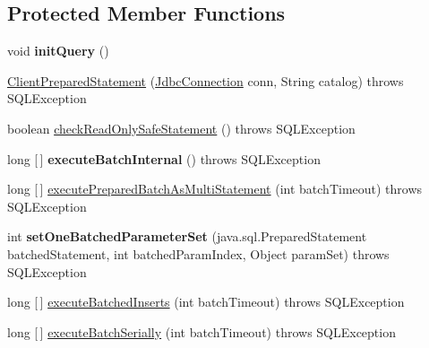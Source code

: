 \subsection*{Protected Member Functions}
\begin{DoxyCompactItemize}
\item 
\mbox{\label{classcom_1_1mysql_1_1cj_1_1jdbc_1_1_client_prepared_statement_a3baa03c73cc707a13dd2c2a82cf523c0}} 
void {\bfseries init\+Query} ()
\item 
\mbox{\hyperlink{classcom_1_1mysql_1_1cj_1_1jdbc_1_1_client_prepared_statement_a7a030c8a939d2cd9798b9b6b1ccc52a1}{Client\+Prepared\+Statement}} (\mbox{\hyperlink{interfacecom_1_1mysql_1_1cj_1_1jdbc_1_1_jdbc_connection}{Jdbc\+Connection}} conn, String catalog)  throws S\+Q\+L\+Exception 
\item 
boolean \mbox{\hyperlink{classcom_1_1mysql_1_1cj_1_1jdbc_1_1_client_prepared_statement_a85e86eaeeabdd9406740be107b722ff5}{check\+Read\+Only\+Safe\+Statement}} ()  throws S\+Q\+L\+Exception 
\item 
\mbox{\label{classcom_1_1mysql_1_1cj_1_1jdbc_1_1_client_prepared_statement_a6e350c039aa5b70044bc999f00ae9421}} 
long \mbox{[}$\,$\mbox{]} {\bfseries execute\+Batch\+Internal} ()  throws S\+Q\+L\+Exception 
\item 
long \mbox{[}$\,$\mbox{]} \mbox{\hyperlink{classcom_1_1mysql_1_1cj_1_1jdbc_1_1_client_prepared_statement_a3d883b0a5de64a49cbbb82c998fb9e5c}{execute\+Prepared\+Batch\+As\+Multi\+Statement}} (int batch\+Timeout)  throws S\+Q\+L\+Exception 
\item 
\mbox{\label{classcom_1_1mysql_1_1cj_1_1jdbc_1_1_client_prepared_statement_a41d32216475bd0739bc83d19ec8c02fd}} 
int {\bfseries set\+One\+Batched\+Parameter\+Set} (java.\+sql.\+Prepared\+Statement batched\+Statement, int batched\+Param\+Index, Object param\+Set)  throws S\+Q\+L\+Exception 
\item 
long \mbox{[}$\,$\mbox{]} \mbox{\hyperlink{classcom_1_1mysql_1_1cj_1_1jdbc_1_1_client_prepared_statement_ad47127dbf61bdfd31b8e0230e8421616}{execute\+Batched\+Inserts}} (int batch\+Timeout)  throws S\+Q\+L\+Exception 
\item 
long \mbox{[}$\,$\mbox{]} \mbox{\hyperlink{classcom_1_1mysql_1_1cj_1_1jdbc_1_1_client_prepared_statement_a47a04fce09744ad87aa6889ef3193df7}{execute\+Batch\+Serially}} (int batch\+Timeout)  throws S\+Q\+L\+Exception 

\end{DoxyCompactItemize}
